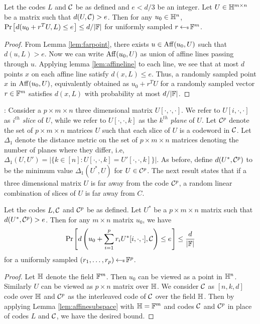 \begin{lemma}\label{lem:affinesubspace}
Let the codes $L$ and $\mathcal{C}$ be as defined and $e<d/3$ be an integer. Let $U\in \mathbb{H}^{m\times n}$ be a matrix such that $d(U,\mathcal{C})>e$. Then for any $u_0\in \mathbb{H}^n$, $\prob{d(u_0+r^TU,L)\leq e}\leq d/|\FF|$ for uniformly sampled $r\hskip2.3pt{\gets\!\!\mbox{\tiny${\$}$\normalsize}}\, \mathbb{F}^m$.
\end{lemma}
\begin{proof}
From Lemma \ref{lem:farpoint}, there exists $u\in {\rm Aff}({u_0},{U})$ such that $d(u,L)>e$. Now we can write ${\rm Aff}({u_0},{U})$ as union of affine lines passing through $u$. Applying lemma \ref{lem:affineline} to each line, we see that at most $d$ points $x$ on each affine line satisfy $d(x,L)\leq e$. Thus, a randomly sampled point $x$ in ${\rm Aff}({u_0},{U})$, equivalently obtained as $u_0+r^TU$ for a randomly sampled vector $r\in \mathbb{F}^m$ satisfies $d(x,L)$ with probability at most $d/|\mathbb{F}|$.
\end{proof}

: Consider a $p\times m\times n$ three dimensional
matrix $U[\cdot,\cdot,\cdot]$. We refer to $U[i,\cdot,\cdot]$ as $i^{th}$ {\em
slice}
of $U$, while we refer to $U[\cdot,\cdot,k]$ as the $k^{th}$ {\em plane} of $U$. Let $\mathcal{C}^p$ denote the set of $p\times m\times n$ matrices $U$ such that
each slice of $U$ is a codeword in $\mathcal{C}$. Let $\Delta_1$ denote the distance
metric on the set of $p\times m\times n$ matrices denoting the number of planes
where they differ, i.e, $\Delta_1(U,U')=|\{k\in [n]:
U[\cdot,\cdot,k]=U'[\cdot,\cdot,k]\}|$. As before, define $d(U^\ast,\mathcal{C}^p)$ to be
the minimum value $\Delta_1(U^\ast,U)$ for $U\in \mathcal{C}^p$. The next result
states that if a three dimensional matrix $U$ is far away from the code
$\mathcal{C}^p$, a random linear combination of slices of $U$ is far away from $C$.

\begin{lemma}[3D Compression]\label{lem:3dcompression}
Let the codes $L,\mathcal{C}$ and $\mathcal{C}^p$ be as defined. Let $U^\ast$ be a
$p\times m\times n$ matrix such that $d(U^\ast,\mathcal{C}^p)>e$. Then for any
$m\times n$ matrix $u_0$, we have 
\[ \prob{d\left(u_0 + \sum_{i=1}^p r_iU^\ast[i,\cdot,\cdot], \mc{C}\right)\leq e}\leq
\frac{d}{|\FF|}\]  
for a uniformly sampled $(r_1,\ldots,r_p)\hskip2.3pt{\gets\!\!\mbox{\tiny${\$}$\normalsize}}\, \mathbb{F}^p$. 
\end{lemma}
\begin{proof}
Let $\mathbb{H}$ denote the field $\mathbb{F}^m$. Then $u_0$ can be viewed as a point in
$\mathbb{H}^n$. Similarly $U$ can be viewed as $p\times n$ matrix over $\mathbb{H}$.
We consider $\mathcal{C}$ as $[n,k,d]$ code over $\mathbb{H}$ and $\mathcal{C}^p$ as the
interleaved code of $\mathcal{C}$ over the field $\mathbb{H}$. Then by applying Lemma \ref{lem:affinesubspace}
with $\mathbb{H}=\mathbb{F}^m$ and codes $\mathcal{C}$ and $\mathcal{C}^p$ in place of codes $L$ and
$\mathcal{C}$, we have the desired bound.
\end{proof}


